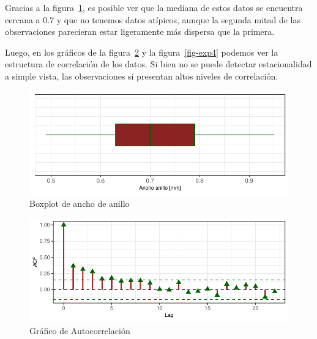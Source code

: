 \documentclass[
  letterpaper,
  DIV=11,
  numbers=noendperiod,
  twocolumn]{scrartcl}
\begin{document}
Gracias a la figura~\ref{fig-exp2}, es posible ver que la mediana de
estos datos se encuentra cercana a 0.7 y que no tenemos datos atípicos,
aunque la segunda mitad de las observaciones parecieran estar
ligeramente más dispersa que la primera.

Luego, en los gráficos de la figura~\ref{fig-exp3} y la
figura~\ref{fig-exp4} podemos ver la estructura de correlación de los
datos. Si bien no se puede detectar estacionalidad a simple vista, las
observaciones sí presentan altos niveles de correlación.

\begin{figure}[H]

{\centering \includegraphics{pdf_tarea2_files/figure-pdf/fig-exp2-1.pdf}

}

\caption{\label{fig-exp2}Boxplot de ancho de anillo}

\end{figure}

\begin{figure}[H]

{\centering \includegraphics{pdf_tarea2_files/figure-pdf/fig-exp3-1.pdf}

}

\caption{\label{fig-exp3}Gráfico de Autocorrelación}

\end{figure}
\end{document}
